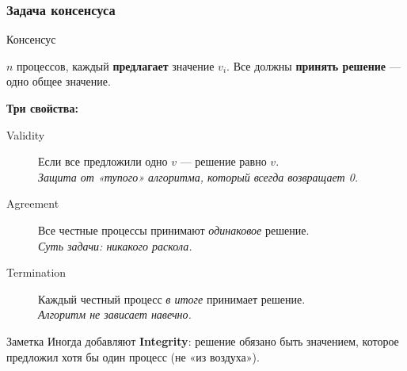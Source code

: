 \documentclass{beamer}
\newenvironment{definitionbox}[1][Определение]{%
  \begin{exampleblock}{#1}
}{%
  \end{exampleblock}
}
\begin{document}
\begin{frame}
\frametitle{Задача консенсуса}

\begin{definitionbox}[Консенсус]
$n$ процессов, каждый \textbf{предлагает} значение $v_i$.
Все должны \textbf{принять решение} --- одно общее значение.
\end{definitionbox}

\vspace{0.4em}
\textbf{Три свойства:}

\begin{description}
  \item[\textcolor{green!60!black}{Validity}]
    Если все предложили одно $v$ --- решение равно $v$.\\
    \textit{\small Защита от «тупого» алгоритма, который всегда возвращает 0.}
  \item[\textcolor{blue!70!black}{Agreement}]
    Все честные процессы принимают \emph{одинаковое} решение.\\
    \textit{\small Суть задачи: никакого раскола.}
  \item[\textcolor{orange!80!black}{Termination}]
    Каждый честный процесс \emph{в итоге} принимает решение.\\
    \textit{\small Алгоритм не зависает навечно.}
\end{description}

\vspace{0.3em}
\begin{exampleblock}{Заметка}
\small Иногда добавляют \textbf{Integrity}: решение обязано быть значением, которое предложил хотя бы один процесс (не «из воздуха»).
\end{exampleblock}
\end{frame}
\end{document}
